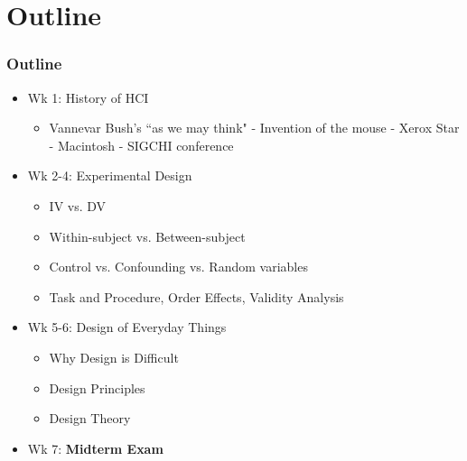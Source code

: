 \documentclass{beamer}
\begin{document}
\section{Outline} %

\begin{frame}
\frametitle{Outline}
\begin{itemize}
	\item Wk 1: History of HCI
	\begin{itemize}
		\item Vannevar Bush's ``as we may think" - Invention of the mouse - Xerox Star - Macintosh - SIGCHI conference
	\end{itemize}
	\item Wk 2-4: Experimental Design
	\begin{itemize}
		\item IV vs. DV
		\item Within-subject vs. Between-subject
		\item Control vs. Confounding vs. Random variables
		\item Task and Procedure, Order Effects, Validity Analysis
	\end{itemize}
	\item Wk 5-6: Design of Everyday Things
	\begin{itemize}
	    \item Why Design is Difficult
		\item Design Principles 
		\item Design Theory
	\end{itemize}	
	\item Wk 7: \textbf{Midterm Exam}
\end{itemize}
\end{frame}
\end{document}

